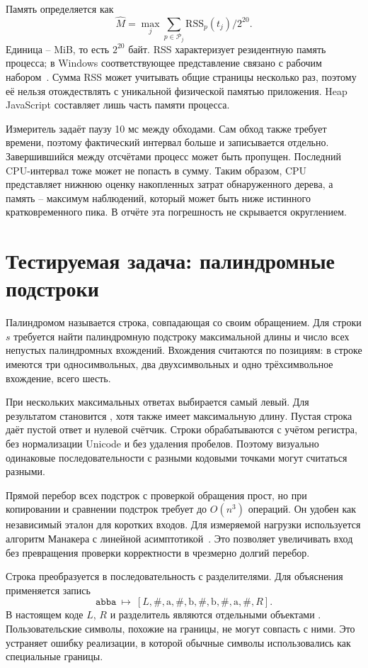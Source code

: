 Память определяется как
\[
 \widehat M=\max_j\sum_{p\in\mathcal P_j}\mathrm{RSS}_p(t_j)/2^{20}.
\]
Единица -- MiB, то есть $2^{20}$ байт. RSS характеризует резидентную память процесса; в Windows соответствующее представление связано с рабочим набором~\cite{psutil}. Сумма RSS может учитывать общие страницы несколько раз, поэтому её нельзя отождествлять с уникальной физической памятью приложения. Heap JavaScript составляет лишь часть памяти процесса.

Измеритель задаёт паузу 10 мс между обходами. Сам обход также требует времени, поэтому фактический интервал больше и записывается отдельно. Завершившийся между отсчётами процесс может быть пропущен. Последний CPU-интервал тоже может не попасть в сумму. Таким образом, CPU представляет нижнюю оценку накопленных затрат обнаруженного дерева, а память -- максимум наблюдений, который может быть ниже истинного кратковременного пика. В отчёте эта погрешность не скрывается округлением.

\section{Тестируемая задача: палиндромные подстроки}
Палиндромом называется строка, совпадающая со своим обращением. Для строки $s$ требуется найти палиндромную подстроку максимальной длины и число всех непустых палиндромных вхождений. Вхождения считаются по позициям: в строке  имеются три односимвольных, два двухсимвольных и одно трёхсимвольное вхождение, всего шесть.

При нескольких максимальных ответах выбирается самый левый. Для  результатом становится , хотя  также имеет максимальную длину. Пустая строка даёт пустой ответ и нулевой счётчик. Строки обрабатываются с учётом регистра, без нормализации Unicode и без удаления пробелов. Поэтому визуально одинаковые последовательности с разными кодовыми точками могут считаться разными.

Прямой перебор всех подстрок с проверкой обращения прост, но при копировании и сравнении подстрок требует до $O(n^3)$ операций. Он удобен как независимый эталон для коротких входов. Для измеряемой нагрузки используется алгоритм Манакера с линейной асимптотикой~\cite{manacher}. Это позволяет увеличивать вход без превращения проверки корректности в чрезмерно долгий перебор.

Строка преобразуется в последовательность с разделителями. Для объяснения применяется запись
\[
 \texttt{abba}\ \longmapsto\
 [L,\#,\mathrm a,\#,\mathrm b,\#,\mathrm b,\#,\mathrm a,\#,R].
\]
В настоящем коде $L$, $R$ и разделитель являются отдельными объектами . Пользовательские символы, похожие на границы, не могут совпасть с ними. Это устраняет ошибку реализации, в которой обычные символы использовались как специальные границы.

